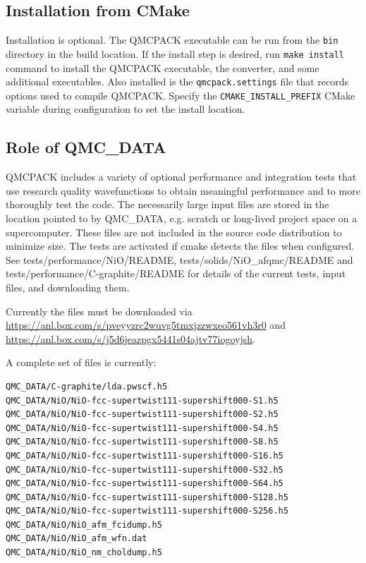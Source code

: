 \subsection{Installation from CMake}
Installation is optional. The QMCPACK executable can be run from the \texttt{bin} directory in the build location.
If the install step is desired, run \texttt{make install} command to install the QMCPACK executable, the converter,
and some additional executables.
Also installed is the \texttt{qmcpack.settings} file that records options used to compile QMCPACK.
Specify the \texttt{CMAKE\_INSTALL\_PREFIX} CMake variable during configuration to set the install location.


\subsection{Role of QMC\_DATA}
QMCPACK includes a variety of optional performance and integration
tests that use research quality wavefunctions to obtain meaningful
performance and to more thoroughly test the code. The necessarily
large input files are stored in the location pointed to by QMC\_DATA,
e.g. scratch or long-lived project space on a supercomputer. These
files are not included in the source code distribution to minimize
size. The tests are activated if cmake detects the files when
configured. See tests/performance/NiO/README,
tests/solids/NiO\_afqmc/README and tests/performance/C-graphite/README
for details of the current tests, input files, and downloading them.

Currently the files must be downloaded via\\
\url{https://anl.box.com/s/pveyyzrc2wuvg5tmxjzzwxeo561vh3r0} and \\
\url{https://anl.box.com/s/j5d6jeazpgx5441s04ajtv77iogoyjsh}.

A complete set of files is currently:
\verbatimfont{\footnotesize}%
\begin{verbatim}
QMC_DATA/C-graphite/lda.pwscf.h5
QMC_DATA/NiO/NiO-fcc-supertwist111-supershift000-S1.h5
QMC_DATA/NiO/NiO-fcc-supertwist111-supershift000-S2.h5
QMC_DATA/NiO/NiO-fcc-supertwist111-supershift000-S4.h5
QMC_DATA/NiO/NiO-fcc-supertwist111-supershift000-S8.h5
QMC_DATA/NiO/NiO-fcc-supertwist111-supershift000-S16.h5
QMC_DATA/NiO/NiO-fcc-supertwist111-supershift000-S32.h5
QMC_DATA/NiO/NiO-fcc-supertwist111-supershift000-S64.h5
QMC_DATA/NiO/NiO-fcc-supertwist111-supershift000-S128.h5
QMC_DATA/NiO/NiO-fcc-supertwist111-supershift000-S256.h5
QMC_DATA/NiO/NiO_afm_fcidump.h5
QMC_DATA/NiO/NiO_afm_wfn.dat
QMC_DATA/NiO/NiO_nm_choldump.h5
\end{verbatim}


